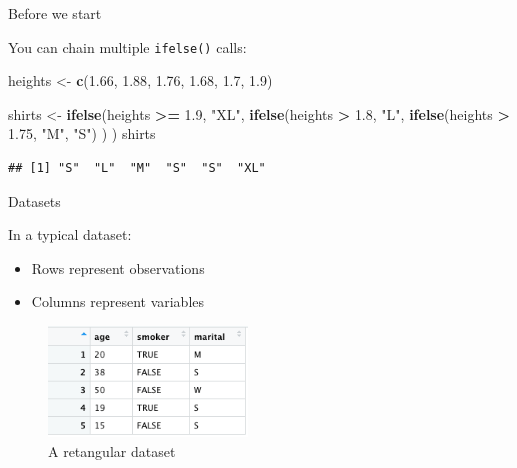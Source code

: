 \documentclass[ignorenonframetext,]{beamer}
\newenvironment{Shaded}{\begin{snugshade}}{\end{snugshade}}
\newcommand{\FloatTok}[1]{\textcolor[rgb]{0.00,0.00,0.81}{#1}}
\newcommand{\KeywordTok}[1]{\textcolor[rgb]{0.13,0.29,0.53}{\textbf{#1}}}
\newcommand{\NormalTok}[1]{#1}
\newcommand{\OperatorTok}[1]{\textcolor[rgb]{0.81,0.36,0.00}{\textbf{#1}}}
\newcommand{\StringTok}[1]{\textcolor[rgb]{0.31,0.60,0.02}{#1}}
\providecommand{\tightlist}{%
  \setlength{\itemsep}{0pt}\setlength{\parskip}{0pt}}
\begin{document}
\begin{frame}[fragile]{Before we start}
\protect\hypertarget{before-we-start-2}{}

You can chain multiple \texttt{ifelse()} calls:

\begin{Shaded}
\begin{Highlighting}[]
\NormalTok{heights <-}\StringTok{ }\KeywordTok{c}\NormalTok{(}\FloatTok{1.66}\NormalTok{, }\FloatTok{1.88}\NormalTok{, }\FloatTok{1.76}\NormalTok{, }\FloatTok{1.68}\NormalTok{, }\FloatTok{1.7}\NormalTok{, }\FloatTok{1.9}\NormalTok{)}

\NormalTok{shirts <-}\StringTok{ }\KeywordTok{ifelse}\NormalTok{(heights }\OperatorTok{>=}\StringTok{ }\FloatTok{1.9}\NormalTok{, }\StringTok{"XL"}\NormalTok{,}
                 \KeywordTok{ifelse}\NormalTok{(heights }\OperatorTok{>}\StringTok{ }\FloatTok{1.8}\NormalTok{, }\StringTok{"L"}\NormalTok{,}
                        \KeywordTok{ifelse}\NormalTok{(heights }\OperatorTok{>}\StringTok{ }\FloatTok{1.75}\NormalTok{, }\StringTok{"M"}\NormalTok{,}
                               \StringTok{"S"}\NormalTok{)}
\NormalTok{                        )}
\NormalTok{                 )}
\NormalTok{shirts}
\end{Highlighting}
\end{Shaded}

\begin{verbatim}
## [1] "S"  "L"  "M"  "S"  "S"  "XL"
\end{verbatim}

\end{frame}

\begin{frame}{Datasets}
\protect\hypertarget{datasets}{}

In a typical dataset:

\begin{itemize}
\tightlist
\item
  Rows represent observations
\item
  Columns represent variables
\end{itemize}

\begin{figure}
\centering
\includegraphics[width=2.08333in,height=\textheight]{figures/dataset}
\caption{A retangular dataset}
\end{figure}

\end{frame}
\end{document}
